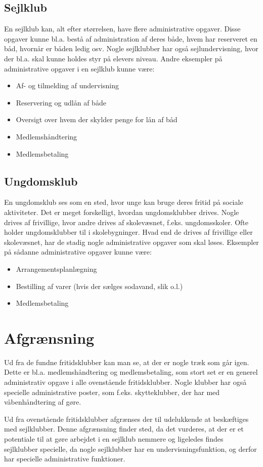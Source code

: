 \subsection{Sejlklub}

En sejlklub kan, alt efter størrelsen, have flere administrative opgaver. Disse opgaver kunne bl.a. bestå af
administration af deres både, hvem har reserveret en båd, hvornår er båden ledig osv. Nogle sejlklubber har
også sejlundervisning, hvor der bl.a. skal kunne holdes styr på elevers niveau. Andre eksempler på
administrative opgaver i en sejlklub kunne være:

\begin{itemize}
  \item Af- og tilmelding af undervisning
  \item Reservering og udlån af både
  \item Oversigt over hvem der skylder penge for lån af båd
  \item Medlemshåndtering
  \item Medlemsbetaling
\end{itemize}


\subsection{Ungdomsklub}

En ungdomsklub ses som en sted, hvor unge kan bruge deres fritid på sociale aktiviteter. Det er meget
forskelligt, hvordan ungdomsklubber drives. Nogle drives af frivillige, hvor andre drives af skolevæsnet,
f.eks. ungdomsskoler. Ofte holder ungdomsklubber til i skolebygninger. Hvad end de drives af frivillige eller
skolevæsnet, har de stadig nogle administrative opgaver som skal løses. Eksempler på sådanne administrative
opgaver kunne være:

\begin{itemize}
  \item Arrangementsplanlægning
  \item Bestilling af varer (hvis der sælges sodavand, slik o.l.)
  \item Medlemsbetaling
\end{itemize}

\section{Afgrænsning}

Ud fra de fundne fritidsklubber kan man se, at der er nogle træk som går igen. Dette er bl.a. medlemshåndtering og
medlemsbetaling, som stort set er en generel administrativ opgave i alle ovenstående fritidsklubber. Nogle klubber har
også specielle administrative poster, som f.eks. skytteklubber, der har med våbenhåndtering af gøre.

Ud fra ovenstående fritidsklubber afgrænses der til udelukkende at beskæftiges med sejlklubber. Denne afgrænsning finder
sted, da det vurderes, at der er et potentiale til at gøre arbejdet i en sejlklub nemmere og ligeledes findes
sejlklubber specielle, da nogle sejlklubber har en undervisningsfunktion, og derfor har specielle administrative
funktioner.
